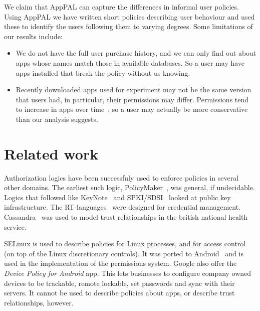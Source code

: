 \documentclass[]{llncs}
\begin{document}
We claim that AppPAL can capture the differences in informal user policies.
Using AppPAL we have written short policies describing user behaviour and used these to identify the users following them to varying degrees.
Some limitations of our results include:
\begin{itemize}
\item We do not have the full user purchase history, and we can only find out about apps whose names match those in available databases.
  So a user may have apps installed that break the policy without us knowing.
\item Recently downloaded apps used for experiment may not be the same version that users had, in particular, their permissions may differ.
  Permissions tend to increase in apps over time~\cite{Wei:2012id}; so a user may actually be more conservative than our analysis suggests.
\end{itemize}

\section{Related work}

Authorization logics have been successfuly used to enforce policies in several other domains.
The earliest such logic, PolicyMaker~\cite{Blaze:dj}, was general, if undecidable.
Logics that followed like KeyNote~\cite{Blaze:1999fa} and SPKI/SDSI~\cite{Ellison:1999ui} looked at public key infrastructure.
The RT-languages~\cite{Li:2002if,Li:2003ix,Li:2003to} were designed for credential management.
Cassandra~\cite{Becker:2004fi} was used to model trust relationships in the british national health service.

SELinux is used to describe policies for Linux processes, and for access control (on top of the Linux discretionary controls).
It was ported to Android~\cite{Smalley:2013vl} and is used in the implementation of the permissions system.
Google also offer the \emph{Device Policy for Android} app.
This lets businesses to configure company owned devices to be trackable, remote lockable, set passwords and sync with their servers.
It cannot be used to describe policies about apps, or describe trust relationships, however.
\end{document}
